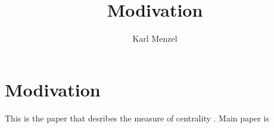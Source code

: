 \documentclass[11pt]{article}
\title{Modivation}
\author{Karl Menzel}
\begin{document}
\maketitle

\section{Modivation}


This is the paper that desribes the measure of centrality \cite{freeman-1991}.  Main paper is \cite{weber-2013}


\end{document}
